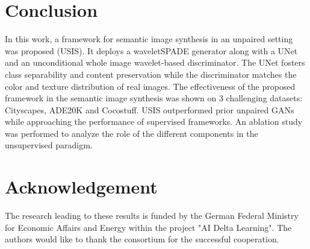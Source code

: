 \documentclass{article}
\begin{document}
\vspace{-1.5em}
\section{Conclusion}
\vspace{-1em}
\label{sec:conclusion}
In this work, a framework for semantic image synthesis in an unpaired setting was proposed (USIS). It deploys a waveletSPADE generator along with a UNet and an unconditional whole image wavelet-based discriminator. The UNet fosters class separability and content preservation while the discriminator matches the color and texture distribution of real images. The effectiveness of the proposed framework in the semantic image synthesis was shown on 3 challenging datasets: Cityscapes, ADE20K and Cocostuff. USIS outperformed prior unpaired GANs while approaching the performance of supervised frameworks. An ablation study was performed to analyze the role of the different components in the unsupervised paradigm. 
\vspace{-1em}
\section*{\centering \normalsize Acknowledgement}
\label{sec:ack}
\vspace{-1em}
{\small The research leading to these results is funded by the German Federal Ministry for Economic Affairs and Energy within the project "AI Delta Learning".  The authors would like to thank the consortium for the successful cooperation.}


\clearpage

\begingroup
{}
\setlength\bibitemsep{0pt}
\printbibliography
\endgroup
\end{document}

